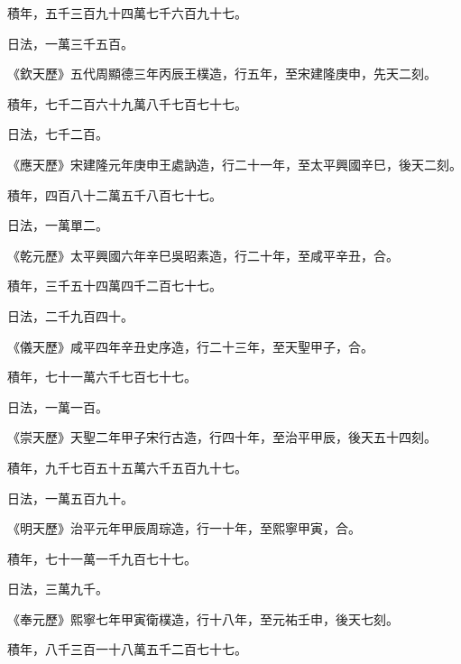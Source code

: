 \begin{pinyinscope}
 積年，五千三百九十四萬七千六百九十七。



 日法，一萬三千五百。



 《欽天歷》五代周顯德三年丙辰王樸造，行五年，至宋建隆庚申，先天二刻。



 積年，七千二百六十九萬八千七百七十七。



 日法，七千二百。



 《應天歷》宋建隆元年庚申王處訥造，行二十一年，至太平興國辛巳，後天二刻。



 積年，四百八十二萬五千八百七十七。



 日法，一萬單二。



 《乾元歷》太平興國六年辛巳吳昭素造，行二十年，至咸平辛丑，合。



 積年，三千五十四萬四千二百七十七。



 日法，二千九百四十。



 《儀天歷》咸平四年辛丑史序造，行二十三年，至天聖甲子，合。



 積年，七十一萬六千七百七十七。



 日法，一萬一百。



 《崇天歷》天聖二年甲子宋行古造，行四十年，至治平甲辰，後天五十四刻。



 積年，九千七百五十五萬六千五百九十七。



 日法，一萬五百九十。



 《明天歷》治平元年甲辰周琮造，行一十年，至熙寧甲寅，合。



 積年，七十一萬一千九百七十七。



 日法，三萬九千。



 《奉元歷》熙寧七年甲寅衛樸造，行十八年，至元祐壬申，後天七刻。



 積年，八千三百一十八萬五千二百七十七。




\end{pinyinscope}
